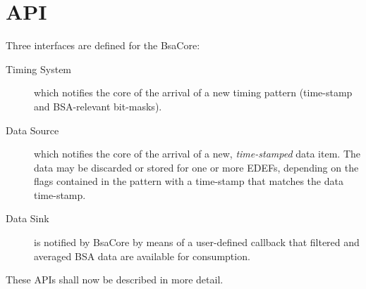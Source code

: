 \documentclass[11pt]{article}
\newcommand{\bsac}{BsaCore}
\newcommand{\bsa} {BSA}
\newcommand{\EDEF}{EDEF}
\begin{document}
\section{API}
Three interfaces are defined for the \bsac{}:
\begin{description}
\item[Timing System] which notifies the core of the arrival of a new timing pattern (time-stamp and
     \bsa{}-relevant bit-masks).
\item[Data Source] which notifies the core of the arrival of a new, {\em time-stamped} data item.
     The data may be discarded or stored for one or more \EDEF{}s, depending on the flags contained
     in the pattern with a time-stamp that matches the data time-stamp.
\item[Data Sink] is notified by \bsac{} by means of a user-defined callback that filtered and averaged
     \bsa{} data are available for consumption.
\end{description}
These APIs shall now be described in more detail.
\end{document}
